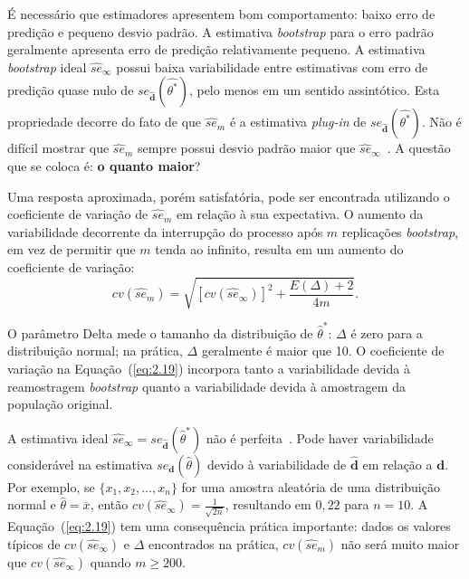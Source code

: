 É necessário que estimadores apresentem bom comportamento: baixo erro de predição e pequeno desvio padrão. A estimativa \textit{bootstrap} para o erro padrão geralmente apresenta erro de predição relativamente pequeno. A estimativa \textit{bootstrap} ideal $\widehat{se}_{\infty}$ possui baixa variabilidade entre estimativas com erro de predição quase nulo de $se_{\widehat{\textbf{d}}}(\widehat{\theta^*})$, pelo menos em um sentido assintótico. Esta propriedade decorre do fato de que $\widehat{se}_m$ é a estimativa \textit{plug-in} de $se_{\widehat{\textbf{d}}}(\widehat{\theta^*})$. Não é difícil mostrar que $\widehat{se}_m$ sempre possui desvio padrão maior que $\widehat{se}_{\infty}$~\cite{EFRON:1993}. A questão que se coloca é: \textbf{o quanto maior}?


Uma resposta aproximada, porém satisfatória, pode ser encontrada utilizando o coeficiente de variação de $\widehat{se}_{m}$ em relação à sua expectativa. O aumento da variabilidade decorrente da interrupção do processo após $m$ replicações \textit{bootstrap}, em vez de permitir que $m$ tenda ao infinito, resulta em um aumento do coeficiente de variação:
\begin{equation}
    cv(\widehat{se}_{m}) = \sqrt{[cv(\widehat{se}_\infty)]^2 + \frac{E(\Delta) + 2}{4m}}.
\label{eq:2.19}
\end{equation}

O parâmetro \gls{Delta} mede o tamanho da distribuição de $\widehat{\theta}^*$: $\Delta$ é zero para a distribuição normal; na prática, $\Delta$ geralmente é maior que 10. O coeficiente de variação na Equação~(\ref{eq:2.19}) incorpora tanto a variabilidade devida à reamostragem \textit{bootstrap} quanto a variabilidade devida à amostragem da população original.

A estimativa ideal $\widehat{se}_\infty = se_{\widehat{\mathbf{d}}}(\widehat{\theta}^*)$ não é perfeita~\cite{EFRON:1993}. Pode haver variabilidade considerável na estimativa $se_{\mathbf{d}}(\widehat{\theta})$ devido à variabilidade de $\widehat{\mathbf{d}}$ em relação a $\mathbf{d}$. Por exemplo, se $\{x_1, x_2, \ldots, x_n\}$ for uma amostra aleatória de uma distribuição normal e $\widehat{\theta} = \overline{x}$, então $cv(\widehat{se}_\infty) = \frac{1}{\sqrt{2n}}$, resultando em $0,22$ para $n = 10$. A Equação~(\ref{eq:2.19}) tem uma consequência prática importante: dados os valores típicos de $cv(\widehat{se}_\infty)$ e $\Delta$ encontrados na prática, $cv(\widehat{se}_m)$ não será muito maior que $cv(\widehat{se}_\infty)$ quando $m \geq 200$.

